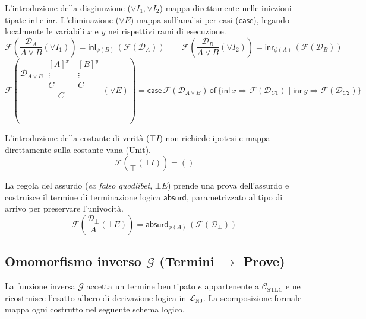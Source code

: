 \begin{description}[leftmargin=1.5em, style=nextline, font=\bfseries]
    \item[Disgiunzione ($\lor$)] 
        L'introduzione della disgiunzione ($\lor I_1, \lor I_2$) mappa direttamente nelle iniezioni tipate $\mathsf{inl}$ e $\mathsf{inr}$. L'eliminazione 
        ($\lor E$) mappa sull'analisi per casi ($\mathsf{case}$), legando localmente le variabili $x$ e $y$ nei rispettivi rami di esecuzione.
        $$ \mathcal{F}\left( \frac{\mathcal{D}_A}{A \lor B} (\lor I_1) \right) = \mathsf{inl}_{\phi(B)} \, (\mathcal{F}(\mathcal{D}_A)) \qquad 
           \mathcal{F}\left( \frac{\mathcal{D}_B}{A \lor B} (\lor I_2) \right) = \mathsf{inr}_{\phi(A)} \, (\mathcal{F}(\mathcal{D}_B)) $$
        \begin{equation*}
            \mathcal{F}\! \left( 
            \frac{\mathcal{D}_{A \lor B} \ 
                \begin{smallmatrix} [A]^x \\[-0.05em] \vdots \\[-0.05em] C \end{smallmatrix} \ 
                \begin{smallmatrix} [B]^y \\[-0.05em] \vdots \\[-0.05em] C \end{smallmatrix}}{C} (\lor E) 
            \right) 
            \!=\! \mathsf{case} \, \mathcal{F}(\mathcal{D}_{A \lor B}) \, \mathsf{of} \, \{ \mathsf{inl} \, x \Rightarrow \mathcal{F}(\mathcal{D}_{C1}) \mid \! \mathsf{inr} \, y \Rightarrow \mathcal{F}(\mathcal{D}_{C2}) \}
        \end{equation*}
    \item[Verità ($\top$)] 
        L'introduzione della costante di verità ($\top I$) non richiede ipotesi e mappa direttamente sulla costante vana (Unit).
        $$ \mathcal{F}\left( \frac{}{\top} (\top I) \right) = () $$
    \item[Falsità ($\bot$)] 
        La regola del assurdo (\emph{ex falso quodlibet}, $\bot E$) prende una prova dell'assurdo e costruisce il 
        termine di terminazione logica $\mathsf{absurd}$, parametrizzato al tipo di arrivo per preservare l'univocità.
        $$ \mathcal{F}\left( \frac{\mathcal{D}_\bot}{A} (\bot E) \right) = 
        \mathsf{absurd}_{\phi(A)} \, (\mathcal{F}(\mathcal{D}_\bot)) $$
\end{description}

\subsection{Omomorfismo inverso \texorpdfstring{$\mathcal{G}$}{G} (Termini \texorpdfstring{$\to$}{to} Prove)}
La funzione inversa $\mathcal{G}$ accetta un termine ben tipato $e$ appartenente a $\mathcal{C}_{\text{STLC}}$ e ne ricostruisce l'esatto albero di derivazione logica in $\mathcal{L}_{\text{NJ}}$. 
La scomposizione formale mappa ogni costrutto nel seguente schema logico.


